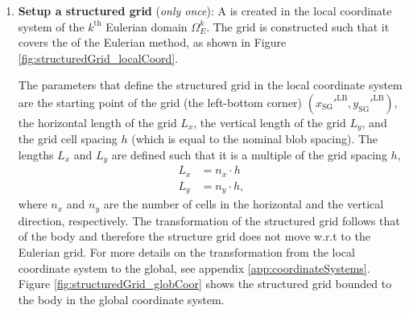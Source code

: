 	\begin{enumerate}[label=1.\alph*)]
	\item \textbf{Setup a structured grid} (\textit{only once}): A  is created in the local coordinate system of the $k^{\mathrm{th}}$ Eulerian domain $\Omega_E^k$. The grid is constructed such that it covers the  of the Eulerian method, as shown in Figure \ref{fig:structuredGrid_localCoord}.

	The parameters that define the structured grid in the local coordinate system are the starting point of the grid (the left-bottom corner) $(x_{\mathrm{SG}}'^{\mathrm{LB}}, y_{\mathrm{SG}}'^{\mathrm{LB}})$, the horizontal length of the grid $L_x$, the vertical length of the grid $L_y$, and the grid cell spacing $h$ (which is equal to the nominal blob spacing). The lengths $L_x$ and $L_y$ are defined such that it is a multiple of the grid spacing $h$,
		\begin{subequations}
		\begin{align}
		L_x &= n_x \cdot h\\
		L_y &= n_y \cdot h,
		\end{align}
		\label{eq:structureGridLengths}
		\end{subequations}
	where $n_x$ and $n_y$ are the number of cells in the horizontal and the vertical direction, respectively. The transformation of the structured grid follows that of the body and therefore the structure grid does not move w.r.t to the Eulerian grid.  For more details on the transformation from the local coordinate system to the global, see appendix \ref{app:coordinateSystems}. Figure \ref{fig:structuredGrid_globCoor} shows the structured grid bounded to the body in the global coordinate system.
	

\end{enumerate}
